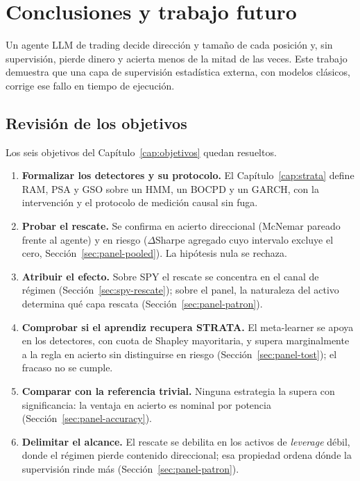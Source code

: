 \chapter{Conclusiones y trabajo futuro}
\label{cap:conclusiones}

Un agente LLM de trading decide dirección y tamaño de cada posición y, sin supervisión, pierde dinero y acierta menos de la mitad de las veces. Este trabajo demuestra que una capa de supervisión estadística externa, con modelos clásicos, corrige ese fallo en tiempo de ejecución.

\section{Revisión de los objetivos}
\label{sec:conc-objetivos}

Los seis objetivos del Capítulo~\ref{cap:objetivos} quedan resueltos.
\begin{enumerate}
  \item \textbf{Formalizar los detectores y su protocolo.} El Capítulo~\ref{cap:strata} define RAM, PSA y GSO sobre un HMM, un BOCPD y un GARCH, con la intervención y el protocolo de medición causal sin fuga.
  \item \textbf{Probar el rescate.} Se confirma en acierto direccional (McNemar pareado frente al agente) y en riesgo ($\Delta$Sharpe agregado cuyo intervalo excluye el cero, Sección~\ref{sec:panel-pooled}). La hipótesis nula se rechaza.
  \item \textbf{Atribuir el efecto.} Sobre SPY el rescate se concentra en el canal de régimen (Sección~\ref{sec:spy-rescate}); sobre el panel, la naturaleza del activo determina qué capa rescata (Sección~\ref{sec:panel-patron}).
  \item \textbf{Comprobar si el aprendiz recupera STRATA.} El meta-learner se apoya en los detectores, con cuota de Shapley mayoritaria, y supera marginalmente a la regla en acierto sin distinguirse en riesgo (Sección~\ref{sec:panel-tost}); el fracaso no se cumple.
  \item \textbf{Comparar con la referencia trivial.} Ninguna estrategia la supera con significancia: la ventaja en acierto es nominal por potencia (Sección~\ref{sec:panel-accuracy}).
  \item \textbf{Delimitar el alcance.} El rescate se debilita en los activos de \emph{leverage} débil, donde el régimen pierde contenido direccional; esa propiedad ordena dónde la supervisión rinde más (Sección~\ref{sec:panel-patron}).
\end{enumerate}

